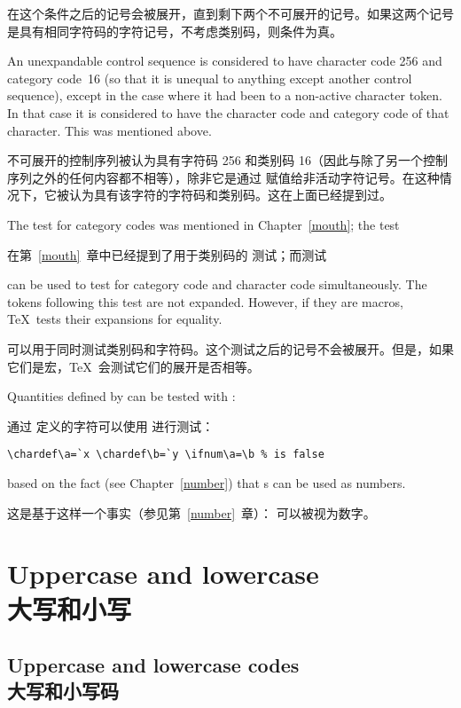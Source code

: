 在这个条件之后的记号会被展开，直到剩下两个不可展开的记号。如果这两个记号是具有相同字符码的字符记号，不考虑类别码，则条件为真。

An unexpandable control
sequence is considered to have character code 256 and
category code~16 (so that it is unequal to anything except
another control sequence), except in the case
where it had been  to a non-active character token.
In that case it is considered to have the character code
and category code of that character. This was mentioned above.

不可展开的控制序列被认为具有字符码 256 和类别码 16（因此与除了另一个控制序列之外的任何内容都不相等），除非它是通过  赋值给非活动字符记号。在这种情况下，它被认为具有该字符的字符码和类别码。这在上面已经提到过。

The test  for category codes was mentioned
in Chapter~\ref{mouth}; the test

在第~\ref{mouth}~章中已经提到了用于类别码的  测试；而测试
\begin{disp}\end{disp}
can be used to test for category code and character code
simultaneously.
The tokens following this test are not expanded.
However, if they are macros, \TeX\
tests their expansions for equality.

可以用于同时测试类别码和字符码。这个测试之后的记号不会被展开。但是，如果它们是宏，\TeX\ 会测试它们的展开是否相等。

Quantities defined by  can be tested with
:

通过  定义的字符可以使用  进行测试：
\begin{verbatim}
\chardef\a=`x \chardef\b=`y \ifnum\a=\b % is false 
\end{verbatim}
based on the fact (see Chapter~\ref{number}) that
s can be used as numbers.

这是基于这样一个事实（参见第~\ref{number}~章）： 可以被视为数字。


\section{Uppercase and lowercase\\大写和小写}

\subsection{Uppercase and lowercase codes\\大写和小写码}
\label{uc/lc}

